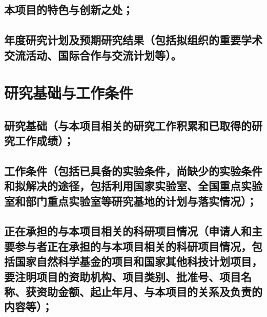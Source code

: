 \documentclass[UTF8, punct, oneside, fontset=none]{ctexbook}
\begin{document}
\begin{MS}
	
\end{MS}

\section{\textbf{本项目的特色与创新之处；}}

\begin{MS}
	
\end{MS}

\section{\textbf{年度研究计划及预期研究结果}（包括拟组织的重要学术交流活动、国际合作与交流计划等）。}

\begin{MS}
	
\end{MS}

\chapter{\textbf{研究基础与工作条件}}
\section{\textbf{研究基础}（与本项目相关的研究工作积累和已取得的研究工作成绩）；}

\begin{MS}
	
\end{MS}

\section{\textbf{工作条件}（包括已具备的实验条件，尚缺少的实验条件和拟解决的途径\kg{0.2em}，包括利用国家实验室、\kg{0.2em}全国重点实验室和部门重点实验室等研究基地的计划与落实情况）；}

\begin{MS}
	
\end{MS}

\section{\textbf{正在承担的与本项目相关的科研项目情况}（申请人和主要参与者正在承担的与本项目相关的科研项目情况，\kg{0.18em}包括国家自然科学基金的项目和国家其他科技计划项目，要注明项目的资助机构、项目类别、批准号、\kg{0.1em}项目名称、\kg{0.1em}获资助金额、\kg{0.1em}起止年月、\kg{0.1em}与本项目的关系及负责的内容等）；}
\end{document}
